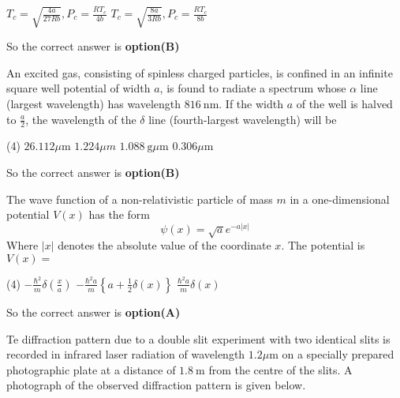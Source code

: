 \begin{questions}
\begin{tasks}
	\task[\textbf{C.}] $T_{c}=\sqrt{\frac{4 a}{27 R b}}, P_{c}=\frac{R T_{c}}{4 b}$
	\task[\textbf{D.}] $T_{c}=\sqrt{\frac{8 a}{3 R b}}, P_{c}=\frac{R T_{c}}{8 b}$
\end{tasks}
\begin{answer}
	So the correct answer is \textbf{option(B)}
\end{answer}
\begin{minipage}{\textwidth}
	\question An excited gas, consisting of spinless charged particles, is confined in an infinite square well potential of width $a$, is found to radiate a spectrum whose $\alpha$ line (largest wavelength) has wavelength $816 \mathrm{~nm}$. If the width $a$ of the well is halved to $\frac{a}{2}$, the wavelength of the $\delta$ line (fourth-largest wavelength) will be
\end{minipage}
\begin{tasks}(4)
	\task[\textbf{A.}] $26.112 \mu \mathrm{m}$
	\task[\textbf{B.}] $1.224 \mu m$
	\task[\textbf{C.}] $1.088 \mathrm{~g} \mu \mathrm{m}$
	\task[\textbf{D.}] $0.306 \mu \mathrm{m}$
\end{tasks}
\begin{answer}
	So the correct answer is \textbf{option(B)}
\end{answer}
\begin{minipage}{\textwidth}
	\question The wave function of a non-relativistic particle of mass $m$ in a one-dimensional potential $V(x)$ has the form
	$$
	\psi(x)=\sqrt{a} e^{-a|x|}
	$$
	Where $|x|$ denotes the absolute value of the coordinate $x .$ The potential is $V(x)=$
\end{minipage}
\begin{tasks}(4)
	\task[\textbf{A.}] $-\frac{\hbar^{2}}{m} \delta\left(\frac{x}{a}\right)$
	\task[\textbf{B.}]   $-\frac{\hbar^{2} a}{m}\left\{a+\frac{1}{2} \delta(x)\right\}$
	\task[\textbf{C.}] $\frac{\hbar^{2} a}{m} \delta(x)$
\end{tasks}
\begin{answer}
	So the correct answer is \textbf{option(A)}
\end{answer}
\begin{minipage}{\textwidth}
	\question Te diffraction pattern due to a double slit experiment with two identical slits is recorded in infrared laser radiation of wavelength $1.2 \mu \mathrm{m}$ on a specially prepared photographic plate at a distance of $1.8 \mathrm{~m}$ from the centre of the slits. A photograph of the observed diffraction pattern is given below.\\

\end{minipage}
\end{questions}
